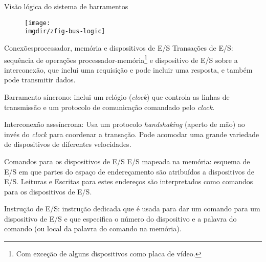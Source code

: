 \def\busslide{
  \begin{frame}{Visão lógica do sistema de barramentos}{}
    \begin{figure}[h]
      \texttt{[image: \\imgdir/zfig-bus-logic]}
    \end{figure}
  \end{frame}
}

\lecturetitle{\insertlecture}{\course}
\frame{\maketitle}

\busslide

\begin{frame}{Conexões}{processador, memória e dispositivos de E/S}{}\small
  { \alert{Transações de E/S: } sequência de
    operações processador-memória\footnote{\tiny Com exceção de alguns
      dispositivos como placa de vídeo.}  e dispositivo de E/S sobre a
    interconexão, que inclui uma requisição e pode incluir uma
    resposta, e também pode
    transmitir dados. \\
  } \pause\bigskip

  { \alert{Barramento síncrono:} inclui um
    relógio (\emph{clock}) que controla as linhas de transmissão e um
    protocolo de comunicação comandado pelo \emph{clock}.  }
  \pause\bigskip

  { \alert{Interconexão asssíncrona:}
    Usa um protocolo \emph{handshaking} (aperto de mão) ao invés
    do \emph{clock} para coordenar a transação. Pode acomodar uma
    grande variedade de dispositivos de diferentes velocidades.
  }

\end{frame}

\begin{frame}{Comandos para os dispositivos de E/S}{}
  { \alert{E/S mapeada na memória:} esquema
    de E/S em que partes do espaço de endereçamento são atribuídos a
    dispositivos de E/S. Leituras e Escritas para estes endereços são
    interpretados como comandos para os dispositivos de E/S.
  }
  \pause\bigskip

  {
    \alert{Instrução de E/S:} instrução dedicada que é usada para dar um comando para
    um dispositivo de E/S e que especifica o número do dispositivo e a palavra do comando
    (ou local da palavra do comando na memória).
  }
\end{frame}

